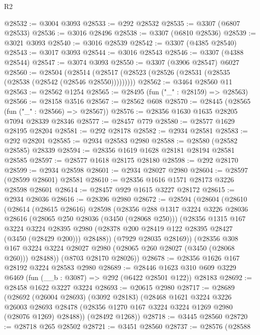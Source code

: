 \begin{lexlean}{R2}
\begin{coremodule}
@28532 := @3004 @3093
@28533 := @292 @28532
@28535 := @3307 (@6807 @28533)
@28536 := @3016 @28496
@28538 := @3307 (@6810 @28536)
@28539 := @3021 @3093
@28540 := @3016 @28539
@28542 := @3307 (@4385 @28540)
@28543 := @3017 @3093
@28544 := @3016 @28543
@28546 := @3307 (@4388 @28544)
@28547 := @3074 @3093
@28550 := @3307 (@3906 @28547) @6027
@28560 := @28504
    (@28514 (@28517 (@28523 (@28526 (@28531 (@28535 (@28538 (@28542 (@28546 @28550)))))))))
@28562 := @3464 @28560 @11
@28563 := @28562 @1254
@28565 := @28495 (fun ("_" : @28159) => @28563)
@28566 := @28158 @3516
@28567 := @28562 @608
@28570 := @28445 (@28565 (fun ("_" : @28566) => @28567))
@28576 := @28356 @1630 @1635 @28205 @7094 @28339 @28346
@28577 := @28457 @779
@28580 := @28577 @1629 @28195 @28204
@28581 := @292 @28178
@28582 := @2934 @28581
@28583 := @292 @28201
@28585 := @2934 @28583 @2980
@28588 := @28580 (@28582 @28585) @28339
@28594 := @28356 @1619 @1628 @28181 @28194 @28581 @28585
@28597 := @28577 @1618 @28175 @28180
@28598 := @292 @28170
@28599 := @2934 @28598
@28601 := @2934 @28027 @2980
@28604 := @28597 (@28599 @28601) @28581
@28610 := @28356 @1616 @1571 @28173 @3226 @28598 @28601
@28614 := @28457 @929 @1615 @3227 @28172
@28615 := @2934 @28036
@28616 := @28396 @2980
@28672 := @28594
    (@28604
      (@28610
        (@28614
          (@28615 @28616)
          @28598
          (@28356
            @288
            @1317
            @3224
            @3226
            @28036
            @28616
            (@28065 @250 @28036 (@3450 (@28068 @250)))
            (@28356
              @1315
              @167
              @3224
              @3224
              @28395
              @2980
              (@28378 @200 @28419 @122 @28395 @28427 (@3450 (@28429 @200)))
              @28488))
          (@7929 @28035 @28169))
        (@28356
          @308
          @167
          @3224
          @3224
          @28027
          @2980
          (@28065 @260 @28027 (@3450 (@28068 @260)))
          @28488))
      (@8703 @28170 @28026))
@28678 := @28356 @1626 @167 @28192 @3224 @28583 @2980
@28689 := @28446 @1623 @310 @609 @3229 @6469 (fun (__b : @3087) => @292 (@6422 @28501 @122)) @28183
@28692 := @28458 @1622 @3227 @3224
@28693 := @20615 @2980
@28717 := @28689
    (@28692
      (@26004 @28693)
      (@3092 @28183)
      (@28468
        @1621
        @3224
        @3226
        @26003
        @28693
        @28478
        (@28356 @1270 @167 @3224 @3224 @1269 @2980 (@28076 @1269) @28488))
      (@28492 @1268))
@28718 := @3445 @28560
@28720 := @28718 @265 @28502
@28721 := @3451 @28560
@28737 := @28576
    (@28588

\end{coremodule}
\end{lexlean}
